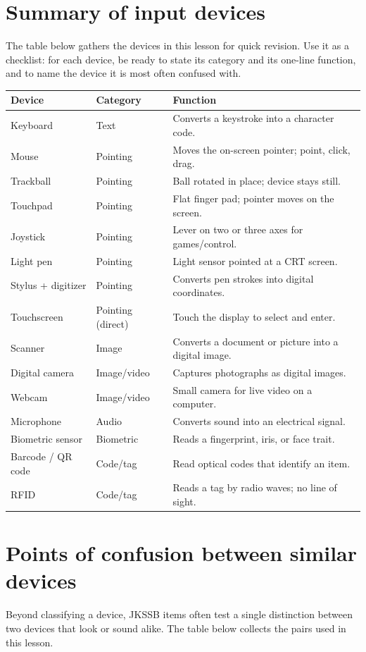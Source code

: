 \documentclass[11pt]{article}
\begin{document}
\section{Summary of input devices}
The table below gathers the devices in this lesson for quick revision. Use it
as a checklist: for each device, be ready to state its category and its
one-line function, and to name the device it is most often confused with.

\begin{center}
\begin{tabular}{p{}p{}p{}}
\toprule
\textbf{Device} & \textbf{Category} & \textbf{Function} \\
\midrule
Keyboard & Text & Converts a keystroke into a character code. \\
Mouse & Pointing & Moves the on-screen pointer; point, click, drag. \\
Trackball & Pointing & Ball rotated in place; device stays still. \\
Touchpad & Pointing & Flat finger pad; pointer moves on the screen. \\
Joystick & Pointing & Lever on two or three axes for games/control. \\
Light pen & Pointing & Light sensor pointed at a CRT screen. \\
Stylus + digitizer & Pointing & Converts pen strokes into digital coordinates. \\
Touchscreen & Pointing (direct) & Touch the display to select and enter. \\
Scanner & Image & Converts a document or picture into a digital image. \\
Digital camera & Image/video & Captures photographs as digital images. \\
Webcam & Image/video & Small camera for live video on a computer. \\
Microphone & Audio & Converts sound into an electrical signal. \\
Biometric sensor & Biometric & Reads a fingerprint, iris, or face trait. \\
Barcode / QR code & Code/tag & Read optical codes that identify an item. \\
RFID & Code/tag & Reads a tag by radio waves; no line of sight. \\
\bottomrule
\end{tabular}
\end{center}

\section{Points of confusion between similar devices}
Beyond classifying a device, JKSSB items often test a single distinction
between two devices that look or sound alike. The table below collects the
pairs used in this lesson.
\end{document}
